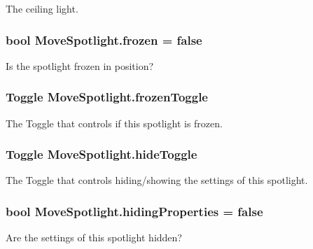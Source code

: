 The ceiling light. 

\subsubsection[{frozen}]{\setlength{\rightskip}{0pt plus 5cm}bool Move\+Spotlight.\+frozen = false}\label{class_move_spotlight_aa22de39a7cf399688b5632b0fa632fa6}


Is the spotlight frozen in position? 

\subsubsection[{frozen\+Toggle}]{\setlength{\rightskip}{0pt plus 5cm}Toggle Move\+Spotlight.\+frozen\+Toggle}\label{class_move_spotlight_ac09eea20cd14e6b07b6097dc7d289acf}


The Toggle that controls if this spotlight is frozen. 

\subsubsection[{hide\+Toggle}]{\setlength{\rightskip}{0pt plus 5cm}Toggle Move\+Spotlight.\+hide\+Toggle}\label{class_move_spotlight_a5f4d11791aa7a41bf3742465409469c3}


The Toggle that controls hiding/showing the settings of this spotlight. 

\subsubsection[{hiding\+Properties}]{\setlength{\rightskip}{0pt plus 5cm}bool Move\+Spotlight.\+hiding\+Properties = false}\label{class_move_spotlight_a722fb5b9e8a719242a968d730e7341fa}


Are the settings of this spotlight hidden? 

